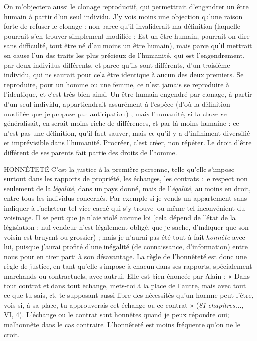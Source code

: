 On m'objectera aussi le clonage reproductif, qui permettrait d’engendrer
un être humain à partir d’un seul individu. J’y vois moins une objection qu’une
raison forte de refuser le clonage : non parce qu’il invaliderait ma définition
(laquelle pourrait s’en trouver simplement modifiée : Est un être humain,
pourrait-on dire sans difficulté, tout être né d’au moins un être humain), mais
parce qu’il mettrait en cause l’un des traits les plus précieux de l'humanité, qui
est l’engendrement, par deux individus différents, et parce qu’ils sont différents,
d’un troisième individu, qui ne saurait pour cela être identique à aucun
des deux premiers. Se reproduire, pour un homme ou une femme, ce n’est
jamais se reproduire à l'identique, et c’est très bien ainsi. Un être humain
engendré par clonage, à partir d’un seul individu, appartiendrait assurément à
l'espèce (d’où la définition modifiée que je propose par anticipation) ; mais
l’humanité, si la chose se généralisait, en serait moins riche de différences, et
par là moins humaine : ce n’est pas une définition, qu’il faut sauver, mais ce
qu'il y a d’infiniment diversifié et imprévisible dans l'humanité. Procréer, c’est
créer, non répéter. Le droit d’être différent de ses parents fait partie des droits
de l’homme.

HONNÊTETÉ C’est la justice à la première personne, telle qu’elle s'impose
surtout dans les rapports de propriété, les échanges, les
contrats : le respect non seulement de la {\it légalité}, dans un pays donné, mais de
l'{\it égalité}, au moins en droit, entre tous les individus concernés. Par exemple si je
vends un appartement sans indiquer à l’acheteur tel vice caché qui s’y trouve,
ou même tel inconvénient du voisinage. Il se peut que je n’aie violé aucune loi
(cela dépend de l’état de la législation : nul vendeur n’est légalement obligé, que
je sache, d’indiquer que son voisin est bruyant ou grossier) ; mais je n’aurai pas
été tout à fait {\it honnête} avec lui, puisque j'aurai profité d’une inégalité (de
connaissance, d’information) entre nous pour en tirer parti à son désavantage.
La règle de l'honnêteté est donc une règle de justice, en tant qu’elle s'impose à
chacun dans ses rapports, spécialement marchands ou contractuels, avec autrui.
Elle est bien énoncée par Alain : « Dans tout contrat et dans tout échange,
mets-toi à la place de l’autre, mais avec tout ce que tu sais, et, te supposant aussi
libre des nécessités qu’un homme peut l'être, vois si, à sa place, tu approuverais
cet échange ou ce contrat » ({\it 81 chapitres...}, VI, 4). L’échange ou le contrat sont
honnêtes quand je peux répondre oui; malhonnête dans le cas contraire.
L’honnêteté est moins fréquente qu’on ne le croit.

